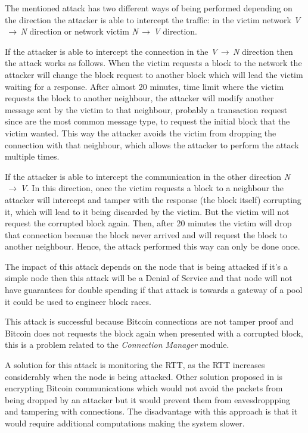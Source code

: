The mentioned attack has two different ways of being performed depending on the direction the attacker is able to intercept the traffic: in the victim network \textit{V$\,\to\,$N} direction or network victim \textit{N$\,\to\,$V} direction. 

If the attacker is able to intercept the connection in the \textit{V$\,\to\,$N} direction then the attack works as follows. When the victim requests a block to the network the attacker will change the block request to another block which will lead the victim waiting for a response. After almost 20 minutes, time limit where the victim requests the block to another neighbour, the attacker will modify another message sent by the victim to that neighbour, probably a transaction request since are the most common message type, to request the initial block that the victim wanted. This way the attacker avoids the victim from dropping the connection with that neighbour, which allows the attacker to perform the attack multiple times.

If the attacker is able to intercept the communication in the other direction \textit{N$\,\to\,$V}. In this direction, once the victim requests a block to a neighbour the attacker will intercept and tamper with the response (the block itself) corrupting it, which will lead to it being discarded by the victim. But the victim will not request the corrupted block again. Then, after 20 minutes the victim will drop that connection because the block never arrived and will request the block to another neighbour. Hence, the attack performed this way can only be done once.

The impact of this attack depends on the node that is being attacked if it's a simple node then this attack will be a Denial of Service and that node will not have guarantees for double spending if that attack is towards a gateway of a pool it could be used to engineer block races.

This attack is successful because Bitcoin connections are not tamper proof and Bitcoin does not requests the block again when presented with a corrupted block, this is a problem related to the \textit{Connection Manager} module.

A solution for this attack is monitoring the RTT, as the RTT increases considerably when the node is being attacked. Other solution proposed in \cite{apostolaki2016hijacking} is encrypting Bitcoin communications which would not avoid the packets from being dropped by an attacker but it would prevent them from eavesdroppping and tampering with connections. The disadvantage with this approach is that it would require additional computations making the system slower. 

